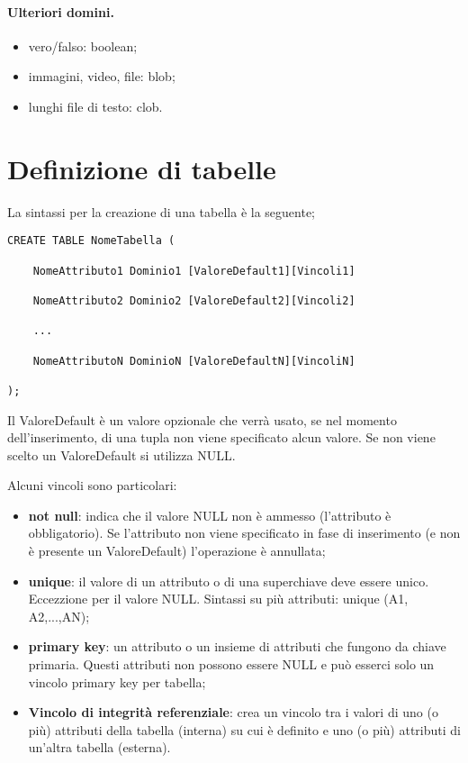 \paragraph{Ulteriori domini.}

\begin{itemize}
    \item vero/falso: boolean;
    \item immagini, video, file: blob;
    \item lunghi file di testo: clob.
\end{itemize}

\section{Definizione di tabelle}

La sintassi per la creazione di una tabella è la seguente;

\begin{lstlisting}[style=SQL, caption=Creazione tabella]
CREATE TABLE NomeTabella (
    
    NomeAttributo1 Dominio1 [ValoreDefault1][Vincoli1]

    NomeAttributo2 Dominio2 [ValoreDefault2][Vincoli2]

    ...

    NomeAttributoN DominioN [ValoreDefaultN][VincoliN]
    
);
\end{lstlisting}

Il ValoreDefault è un valore opzionale che verrà usato, se nel momento dell'inserimento, di una tupla non viene specificato alcun valore. Se non viene scelto un ValoreDefault si utilizza NULL.

Alcuni vincoli sono particolari:

\begin{itemize}
    \item \textbf{not null}: indica che il valore NULL non è ammesso (l'attributo è obbligatorio). Se l'attributo non viene specificato in fase di inserimento (e non è presente un ValoreDefault) l'operazione è annullata;
    \item \textbf{unique}: il valore di un attributo o di una superchiave deve essere unico. Eccezzione per il valore NULL. Sintassi su più attributi: unique (A1, A2,...,AN);
    \item \textbf{primary key}: un attributo o un insieme di attributi che fungono da chiave primaria. Questi attributi non possono essere NULL e può esserci solo un vincolo primary key per tabella;
    \item \textbf{Vincolo di integrità referenziale}: crea un vincolo tra i valori di uno (o più) attributi della tabella (interna) su cui è definito e uno (o più) attributi di un’altra tabella (esterna).
\end{itemize}

